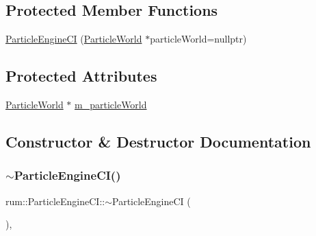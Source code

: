 \subsection*{Protected Member Functions}
\begin{DoxyCompactItemize}
\item 
\mbox{\hyperlink{classrum_1_1_particle_engine_c_i_aa411d6267149a6fa462185501319cfe8}{Particle\+Engine\+CI}} (\mbox{\hyperlink{classrum_1_1_particle_world}{Particle\+World}} $\ast$particle\+World=nullptr)
\end{DoxyCompactItemize}
\subsection*{Protected Attributes}
\begin{DoxyCompactItemize}
\item 
\mbox{\hyperlink{classrum_1_1_particle_world}{Particle\+World}} $\ast$ \mbox{\hyperlink{classrum_1_1_particle_engine_c_i_a99948cbb49d93cde3140b29b4360e01f}{m\+\_\+particle\+World}}
\end{DoxyCompactItemize}


\subsection{Constructor \& Destructor Documentation}
\mbox{\label{classrum_1_1_particle_engine_c_i_ac1665e30d69943116bb7ee5f38f26429}} 
\subsubsection{\texorpdfstring{$\sim$\+Particle\+Engine\+C\+I()}{~ParticleEngineCI()}}
{\footnotesize\ttfamily rum\+::\+Particle\+Engine\+C\+I\+::$\sim$\+Particle\+Engine\+CI (\begin{DoxyParamCaption}{ }\end{DoxyParamCaption})\hspace{0.3cm}{\ttfamily [virtual]}, {\ttfamily [default]}}

\mbox{\label{classrum_1_1_particle_engine_c_i_aa411d6267149a6fa462185501319cfe8}} 
